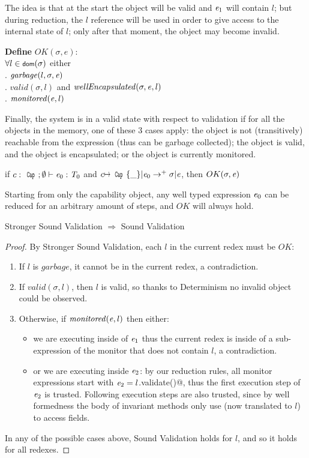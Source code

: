 The idea is that at the start the object will be valid and ${\mathit{e}}_1$ will contain $l$;
but during reduction, the $l$ reference will be used in order to
give access to the internal state of $l$; only after that moment, the object may become invalid.


\noindent\textbf{Define} $OK(\sigma,e)$:\\
\indent $\forall l\in\dom(\sigma)$
  either\\
\indent{}. $\mathit{garbage}(l,\sigma,\e)$\\
\indent{}. $\mathit{valid}(\sigma,l)$ and $\mathit{wellEncapsulated}(\sigma,\e,l)$\\
\indent{}. $\mathit{monitored}({\mathit{e}},l)$

Finally, the system is in a valid state with respect to validation
if for all the objects in the memory, one of these 3 cases apply:
the object is not (transitively) reachable from the expression (thus can be garbage collected);
the object is valid, and the object is encapsulated;
or the object is currently monitored.

\begin{theorem}
if $c:\Kw{Cap};\emptyset\vdash \e_0: \T_0$ and
$c\mapsto\Kw{Cap}\{\_\}|\e_0\rightarrow^+ \sigma|\e$, then
$OK(\sigma,\e)$
\end{theorem}
\noindent Starting from only the capability object,
any well typed expression ${\mathit{e}}_0$ can be reduced for an arbitrary amount of steps,
and $OK$ will always hold.
\\
\begin{theorem} Stronger Sound Validation $\Rightarrow$ Sound Validation
\end{theorem}
\begin{proof}
\noindent By Stronger Sound Validation, each $l$ in the current redex must be $OK$:
\begin{enumerate}
	\item If $l$ is $garbage$, it cannot be in the current redex, a contradiction.
	\item If $\mathit{valid}(\sigma,l)$, then $l$ is valid, so thanks to Determinism
	no invalid object could be observed.
	\item Otherwise, if $\mathit{monitored}({\mathit{e}},l)$ then either:
	\begin{itemize}
	 \item we are executing inside of ${\mathit{e}}_1$ thus the current redex is inside of a sub-expression of the monitor that does not contain $l$, a contradiction.
	 \item or we are executing inside ${\mathit{e}}_2$:
	 by our reduction rules, all monitor expressions start with
	 ${\mathit{e}}_2=l$\Q@.validate()@, thus the first execution step
	 of ${\mathit{e}}_2$ is trusted. Following execution steps are also trusted, since by well formedness the body of invariant methods only use \Q@this@ (now translated to $l$) to access fields.
	\end{itemize}
\end{enumerate}
In any of the possible cases above, Sound Validation holds for $l$, and so it holds for all redexes.
\end{proof}

